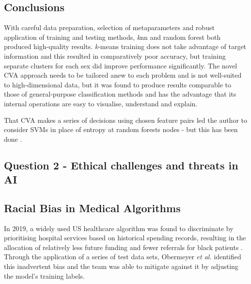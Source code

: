 \documentclass[a4paper, 11pt]{article}
\begin{document}
\vspace{\baselineskip}

\subsection*{Conclusions}

With careful data preparation, selection of metaparameters and robust application of training and testing methods, 
\textit{k}nn and random forest both produced high-quality results. 
\textit{k}-means training does not take advantage of target information and this resulted in comparatively poor accuracy, but training
separate clusters for each sex did improve performance significantly.
The novel CVA approach needs to be tailored anew to each problem and is not well-suited to high-dimensional data, 
but it was found to produce results comparable to those of general-purpose classification methods and has the advantage that 
its internal operations are easy to visualise, understand and explain.

That CVA makes a series of decisions using chosen feature pairs 
led the author to consider SVMs in place of entropy at random forests nodes - 
but this has been done \cite{law2003support}.

\vspace{-0.1\baselineskip} %
\begin{center}
\subsection*{Question 2 - Ethical challenges and threats in AI}
\end{center}
\vspace{0.1\baselineskip} %
\subsection*{Racial Bias in Medical Algorithms}

In 2019, a widely used US healthcare algorithm was found to discriminate by prioritising hospital services 
based on historical spending records, resulting in the allocation of relatively less future funding and fewer referrals 
for black patients \cite{Jemielity2019, Ledford2019}. 
Through the application of a series of test data sets, Obermeyer \textit{et al.} \cite{Obermeyer2019} identified this inadvertent bias 
and the team was able to mitigate against it by adjusting the model’s training labels. 
\end{document}
